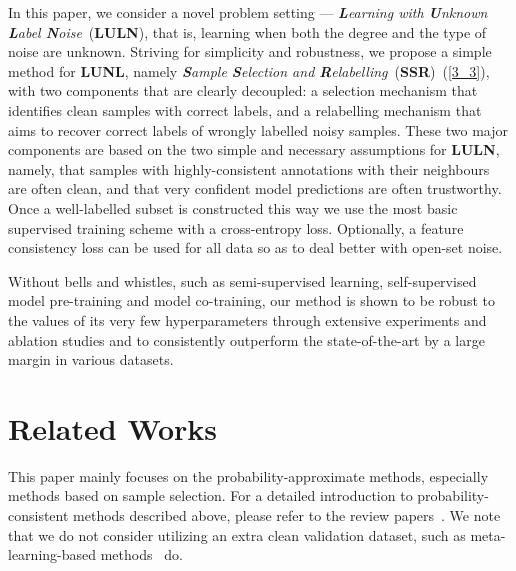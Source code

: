\documentclass{bmvc2k}
\begin{document}
In this paper, we consider a novel problem setting --- \textit{\textbf{L}earning with \textbf{U}nknown \textbf{L}abel \textbf{N}oise}~(\textbf{LULN}), that is, learning when both the degree and the type of noise are unknown.
Striving for simplicity and robustness, we propose a simple method for \textbf{LUNL}, namely \textit{\textbf{S}ample \textbf{S}election and \textbf{R}elabelling}~(\textbf{SSR})~(\cref{3_3}), with two components that are clearly decoupled: a selection mechanism that identifies clean samples with correct labels, and a relabelling mechanism that aims to recover correct labels of wrongly labelled noisy samples. These two major components are based on the two simple and necessary assumptions for \textbf{LULN}, namely, that samples with highly-consistent annotations with their neighbours are often clean, and that very confident model predictions are often trustworthy. Once a well-labelled subset is constructed this way we use the most basic supervised training scheme with a cross-entropy loss. Optionally, a feature consistency loss can be used for all data so as to deal better with open-set noise. 

Without bells and whistles, such as semi-supervised learning, self-supervised model pre-training and model co-training, our method is shown to be robust to the values of its very few hyperparameters through extensive experiments and ablation studies and to consistently outperform the state-of-the-art by a large margin in various datasets.


\section{Related Works}
This paper mainly focuses on the probability-approximate methods, especially methods based on sample selection. For a detailed introduction to probability-consistent methods described above, please refer to the review papers~\citep{review1, review2}. We note that we do not consider utilizing an extra clean validation dataset, such as meta-learning-based methods~\citep{mwnet, famus} do. 
\end{document}
